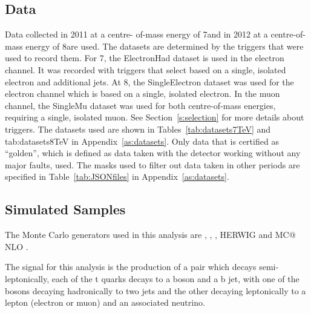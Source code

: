\subsection{Data}
\label{ss:data}

Data collected in 2011 at a centre-  of-mass energy of 7\TeV and in 2012 at a centre-of-mass energy of
8\TeV are used. The datasets are determined by the triggers that were used to record them. For 7\TeV, the ElectronHad
dataset is used in the electron channel. It was recorded with triggers that select based on a single, isolated
electron and additional jets. At 8\TeV, the SingleElectron dataset was used for the electron channel
which is based on a single, isolated electron. In the muon channel, the SingleMu dataset was used for both
centre-of-mass energies, requiring a single, isolated muon. See Section~\ref{s:selection} for more
details about triggers. The datasets used are shown in Tables~\ref{tab:datasets7TeV} and {tab:datasets8TeV} in
Appendix~\ref{as:datasets}. Only data that is certified as “golden”, which is defined as data taken with the
detector working without any major faults, used. The masks used to filter out data taken in other periods are
specified in Table~\ref{tab:JSONfiles} in Appendix~\ref{as:datasets}.

\subsection{Simulated Samples}
\label{ss:simulated_samples}
The Monte Carlo generators used in this analysis are \MADGRAPH \cite{madgraph}, \PYTHIA \cite{pythia8}, \POWHEG
\cite{powheg_Nason,powheg_Frixione,powheg_Alioli}, HERWIG \cite{herwig} and MC$@$NLO
\cite{mcatnlo_Frixione1, mcatnlo_Frixione2}.

The signal for this analysis is the production of a \ttbar pair which decays semi-leptonically, \ie each of
the t quarks decays to a \W boson and a b jet, with one of the \W bosons decaying hadronically to two jets and
the other decaying leptonically to a lepton (electron or muon) and an associated neutrino.

